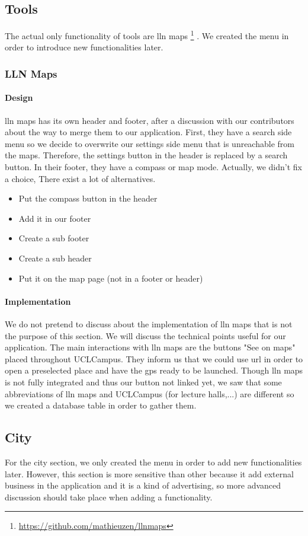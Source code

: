 \documentclass{eplmastersthesis}
\begin{document}
\subsection{Tools}
The actual only functionality of tools are lln maps \footnote{\url{https://github.com/mathieuzen/llnmaps}} . We created the menu in order to introduce new functionalities later. 
\subsubsection{LLN Maps}
\paragraph{Design}
lln maps has its own header and footer, after a discussion with our contributors about the way to merge them to our application. First, they have a search side menu so we decide to overwrite our settings side menu that is unreachable from the maps. Therefore, the settings button in the header is replaced by a search button. In their footer, they have a compass or map mode. Actually, we didn't fix a choice, There exist a lot of alternatives.
\begin{itemize}
\item Put the compass button in the header
\item Add it in our footer
\item Create a sub footer
\item Create a sub header
\item Put it on the map page (not in a footer or header) 
\end{itemize}
\paragraph{Implementation}
We do not pretend to discuss about the implementation of lln maps that is not the purpose of this section. We will discuss the technical points useful for our application. The main interactions with lln maps are the buttons "See on maps" placed throughout UCLCampus. They inform us that we could use url in order to open a preselected place and have the gps ready to be launched. Though lln maps is not fully integrated and thus our button not linked yet, we saw that some abbreviations of lln maps and UCLCampus (for lecture halls,...) are different so we created a database table in order to gather them. 
\subsection{City}
For the city section, we only created the menu in order to add new functionalities later. However, this section is more sensitive than other because it add external business in the application and it is a kind of advertising, so more advanced discussion should take place when adding a functionality.
\end{document}
